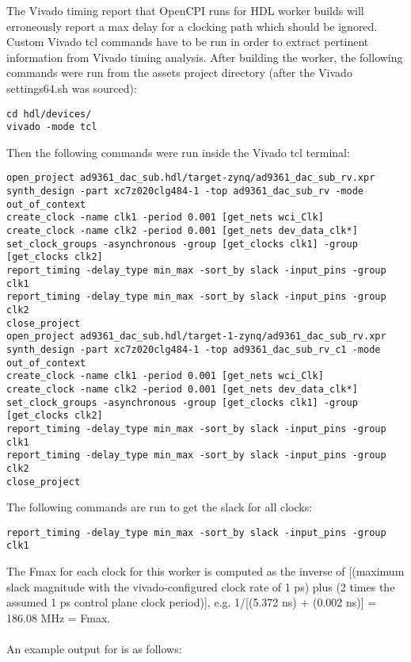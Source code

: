 \documentclass{article}
\begin{document}
The Vivado timing report that OpenCPI runs for HDL worker builds will erroneously report a max delay for a clocking path which should be ignored. Custom Vivado tcl commands have to be run in order to extract pertinent information from Vivado timing analysis. After building the worker, the following commands were run from the assets project directory (after the Vivado settings64.sh was sourced):
\begin{lstlisting}
cd hdl/devices/
vivado -mode tcl
\end{lstlisting}
Then the following commands were run inside the Vivado tcl terminal:
\begin{lstlisting}
open_project ad9361_dac_sub.hdl/target-zynq/ad9361_dac_sub_rv.xpr
synth_design -part xc7z020clg484-1 -top ad9361_dac_sub_rv -mode out_of_context
create_clock -name clk1 -period 0.001 [get_nets wci_Clk]
create_clock -name clk2 -period 0.001 [get_nets dev_data_clk*]
set_clock_groups -asynchronous -group [get_clocks clk1] -group [get_clocks clk2]
report_timing -delay_type min_max -sort_by slack -input_pins -group clk1
report_timing -delay_type min_max -sort_by slack -input_pins -group clk2
close_project
open_project ad9361_dac_sub.hdl/target-1-zynq/ad9361_dac_sub_rv.xpr
synth_design -part xc7z020clg484-1 -top ad9361_dac_sub_rv_c1 -mode out_of_context
create_clock -name clk1 -period 0.001 [get_nets wci_Clk]
create_clock -name clk2 -period 0.001 [get_nets dev_data_clk*]
set_clock_groups -asynchronous -group [get_clocks clk1] -group [get_clocks clk2]
report_timing -delay_type min_max -sort_by slack -input_pins -group clk1
report_timing -delay_type min_max -sort_by slack -input_pins -group clk2
close_project
\end{lstlisting}
The following commands are run to get the slack for all clocks:
\begin{lstlisting}
report_timing -delay_type min_max -sort_by slack -input_pins -group clk1
\end{lstlisting}
The Fmax for each clock for this worker is computed as the inverse of [(maximum slack magnitude with the vivado-configured clock rate of 1 ps) plus (2 times the assumed 1 ps control plane clock period)], e.g. 1/[(5.372 ns) + (0.002 ns)] = 186.08 MHz = Fmax. \\ \\
An example output for is as follows:
\end{document}
